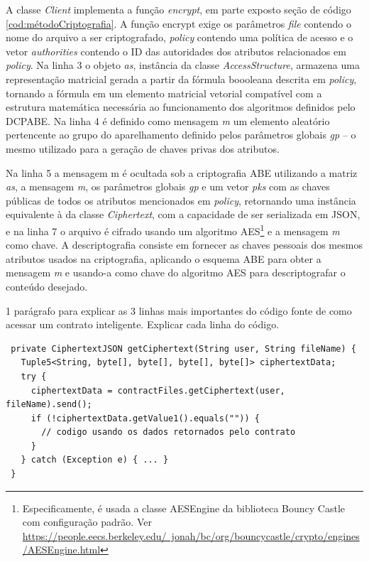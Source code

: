\documentclass[a4paper,11pt]{article}
\begin{document}
A classe \emph{Client} implementa a função \emph{encrypt}, em parte exposto seção de código \ref{cod:métodoCriptografia}.
A função encrypt exige os parâmetros \emph{file} contendo o nome do arquivo a ser criptografado, \emph{policy} contendo uma política de acesso e o vetor \emph{authorities} contendo o ID das autoridades dos atributos relacionados em \emph{policy}.
Na linha 3 o objeto \emph{as}, instância da classe \emph{AccessStructure}, armazena uma representação matricial gerada a partir da fórmula boooleana descrita em \emph{policy}, tornando a fórmula em um elemento matricial vetorial compatível com a estrutura matemática necessária ao funcionamento dos algoritmos definidos pelo DCPABE.
Na linha 4 é definido como mensagem \emph{m} um elemento aleatório pertencente ao grupo do aparelhamento definido pelos parâmetros globais \emph{gp} -- o mesmo utilizado para a geração de chaves privas dos atributos.

Na linha 5 a mensagem m é ocultada sob a criptografia ABE utilizando a matriz \emph{as}, a mensagem \emph{m}, os parâmetros globais \emph{gp} e um vetor \emph{pks} com as chaves públicas de todos os atributos mencionados em \emph{policy}, retornando uma instância equivalente à da classe \emph{Ciphertext}, com a capacidade de ser serializada em JSON, e na linha 7 o arquivo é cifrado usando um algoritmo AES\footnote{Especificamente, é usada a classe AESEngine da biblioteca Bouncy Castle com configuração padrão. Ver \href{https://people.eecs.berkeley.edu/~jonah/bc/org/bouncycastle/crypto/engines/AESEngine.html}{https://people.eecs.berkeley.edu/~jonah/bc/org/bouncycastle/crypto/engines/AESEngine.html}} e a mensagem \emph{m} como chave. A descriptografia consiste em fornecer as chaves pessoais dos mesmos atributos usados na criptografia, aplicando o esquema ABE para obter a mensagem \emph{m} e usando-a como chave do algoritmo AES para descriptografar o conteúdo desejado.

{\color{Magenta} 1 parágrafo para explicar as 3 linhas mais importantes do código fonte de como acessar um contrato inteligente. Explicar cada linha do código.}


\begin{lstlisting}
 private CiphertextJSON getCiphertext(String user, String fileName) {
   Tuple5<String, byte[], byte[], byte[], byte[]> ciphertextData;
   try {
     ciphertextData = contractFiles.getCiphertext(user, fileName).send();
     if (!ciphertextData.getValue1().equals("")) {
       // codigo usando os dados retornados pelo contrato
     }
   } catch (Exception e) { ... }
 }
\end{lstlisting}
\end{document}
